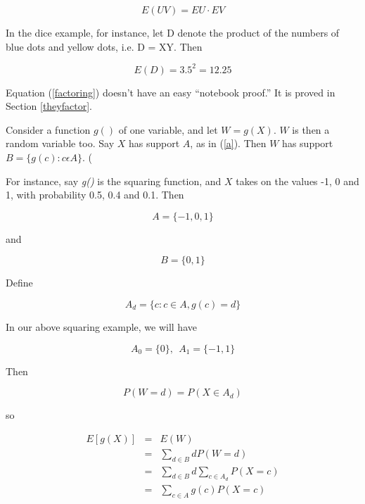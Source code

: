 \begin{equation}
\label{factoring}
E(UV) = EU \cdot EV
\end{equation}


In the dice example, for instance, let D denote the product of the
numbers of blue dots and yellow dots, i.e. D = XY.  Then

\begin{equation}
E(D) = 3.5^2 = 12.25
\end{equation}

Equation (\ref{factoring}) doesn't have an easy ``notebook proof.'' It
is proved in Section \ref{theyfactor}.

Consider a function $g()$ of one variable, and let $W = g(X)$.  $W$ is then a
random variable too.  Say $X$ has support $A$, as in (\ref{a}).  Then $W$ has
support $B = \{g(c): c \epsilon A \}$.  (

For instance, say {\it g()} is the squaring function, and $X$ takes on
the values -1, 0 and 1, with probability 0.5, 0.4 and 0.1.  Then

\begin{equation}
A = \{ -1,0,1 \}
\end{equation}

and 

\begin{equation}
B = \{ 0,1 \}
\end{equation}

Define

\begin{equation}
A_d = \{c: c \in A, g(c) = d\}
\end{equation}

In our above squaring example, we will have

\begin{equation}
A_0 = \{ 0 \}, ~~ A_1 = \{ -1,1 \}
\end{equation}

Then 

\begin{equation}
P(W = d) = P(X \in A_d) 
\end{equation}

so

\begin{eqnarray}
E[g(X)] &=& E(W) \\
&=& \sum_{d \in B} d P(W = d) \\ 
&=& \sum_{d \in B} d \sum_{c \in A_d} P(X = c) \\
&=& \sum_{c \in A} g(c) P(X = c) 
\end{eqnarray}

